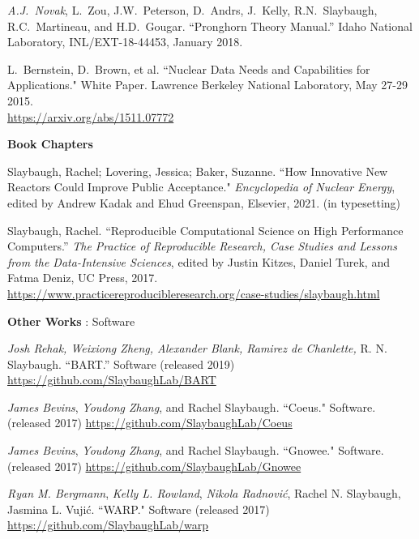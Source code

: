 \begin{bibsection}
\item	\textit{A.J.\ Novak}, L.\ Zou, J.W.\ Peterson, D.\ Andrs, J.\ Kelly, R.N.\ Slaybaugh, R.C.\ Martineau, and H.D.\ Gougar. “Pronghorn Theory Manual.” Idaho National Laboratory, INL/EXT-18-44453, January 2018.

\item L.\ Bernstein, D.\ Brown, et al. ``Nuclear Data Needs and Capabilities for Applications." White Paper. Lawrence Berkeley National Laboratory, May 27-29 2015. \\
\url{https://arxiv.org/abs/1511.07772}


\item \textbf{Book Chapters}
\item Slaybaugh, Rachel; Lovering, Jessica; Baker, Suzanne. ``How Innovative New Reactors
Could Improve Public Acceptance." \textit{Encyclopedia of Nuclear Energy},
edited by Andrew Kadak and Ehud Greenspan, Elsevier, 2021. (in typesetting)

\item Slaybaugh, Rachel. ``Reproducible Computational Science on High Performance Computers.'' \textit{The Practice of Reproducible Research, Case Studies and Lessons from the Data-Intensive Sciences}, edited by Justin Kitzes, Daniel Turek, and Fatma Deniz, UC Press, 2017. \\ \url{https://www.practicereproducibleresearch.org/case-studies/slaybaugh.html}


\item \textbf{Other Works} : Software
\item \textit{Josh Rehak, Weixiong Zheng, Alexander Blank, Ramirez de Chanlette,} R. N. Slaybaugh. “BART.” Software (released 2019) \\
\url{https://github.com/SlaybaughLab/BART}

\item \textit{James Bevins}, \textit{Youdong Zhang}, and Rachel Slaybaugh. ``Coeus." Software. (released 2017) \url{https://github.com/SlaybaughLab/Coeus} 

\item \textit{James Bevins}, \textit{Youdong Zhang}, and Rachel Slaybaugh. ``Gnowee." Software. (released 2017) \url{https://github.com/SlaybaughLab/Gnowee} 

\item \textit{Ryan M. Bergmann}, \textit{Kelly L. Rowland}, \textit{Nikola Radnovi\'c}, Rachel N. Slaybaugh, Jasmina L. Vuji\'c. ``WARP." Software (released 2017) \url{https://github.com/SlaybaughLab/warp}


\end{bibsection}
